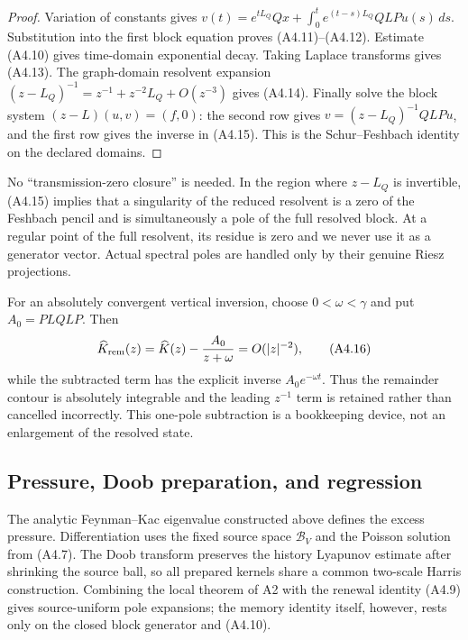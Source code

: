 \begin{proof}
Variation of constants gives
$v(t)=e^{tL_Q}Qx+\int_0^te^{(t-s)L_Q}QLPu(s)\,ds$.
Substitution into the first block equation proves (A4.11)--(A4.12).  Estimate
(A4.10) gives time-domain exponential decay.  Taking Laplace transforms gives
(A4.13).  The graph-domain resolvent expansion
$(z-L_Q)^{-1}=z^{-1}+z^{-2}L_Q+O(z^{-3})$ gives (A4.14).
Finally solve the block system $(z-L)(u,v)=(f,0)$: the second row gives
$v=(z-L_Q)^{-1}QLPu$, and the first row gives the inverse in (A4.15).  This is
the Schur--Feshbach identity on the declared domains.
\end{proof}

No ``transmission-zero closure'' is needed.  In the region where
$z-L_Q$ is invertible, (A4.15) implies that a singularity of the reduced
resolvent is a zero of the Feshbach pencil and is simultaneously a pole of the
full resolved block.  At a regular point of the full resolvent, its residue is
zero and we never use it as a generator vector.  Actual spectral poles are
handled only by their genuine Riesz projections.

For an absolutely convergent vertical inversion, choose
$0<\omega<\gamma$ and put $A_0=PLQLP$.  Then
\[
 \widehat K_{\rm rem}(z)=\widehat K(z)-{A_0\over z+\omega}
 =O(|z|^{-2}),                                           \tag{A4.16}
\]
while the subtracted term has the explicit inverse $A_0e^{-\omega t}$.
Thus the remainder contour is absolutely integrable and the leading
$z^{-1}$ term is retained rather than cancelled incorrectly.  This
one-pole subtraction is a bookkeeping device, not an enlargement of the
resolved state.

\subsection{Pressure, Doob preparation, and regression}

The analytic Feynman--Kac eigenvalue constructed above defines the excess
pressure.  Differentiation uses the fixed source space $\mathcal B_V$ and the
Poisson solution from (A4.7).  The Doob transform preserves the history
Lyapunov estimate after shrinking the source ball, so all prepared kernels
share a common two-scale Harris construction.  Combining the local theorem of
A2 with the renewal identity (A4.9) gives source-uniform pole expansions; the
memory identity itself, however, rests only on the closed block generator and
(A4.10).

